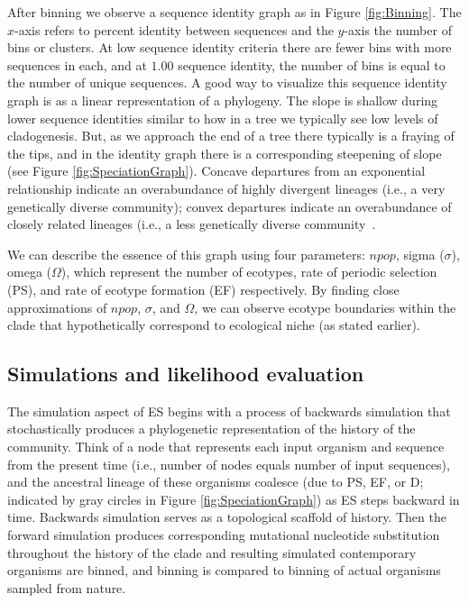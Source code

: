 After binning we observe a sequence identity graph as in Figure \ref{fig:Binning}.
The $x$-axis refers to percent identity between sequences and the $y$-axis the number of bins or clusters.
At low sequence identity criteria there are fewer bins with more sequences in each, and at $1.00$ sequence identity, the number of bins is equal to the number of unique sequences.
A good way to visualize this sequence identity graph is as a linear representation of a phylogeny.
The slope is shallow during lower sequence identities similar to how in a tree we typically see low levels of cladogenesis.
But, as we approach the end of a tree there typically is a fraying of the tips, and in the identity graph there is a corresponding steepening of slope (see Figure \ref{fig:SpeciationGraph}).
Concave departures from an exponential relationship indicate an overabundance of highly divergent lineages (i.e., a very genetically diverse community); convex departures indicate an overabundance of closely related lineages (i.e., a less genetically diverse community~\cite{bohannan2003new}.

We can describe the essence of this graph using four parameters: $npop$, sigma ($\sigma$), omega ($\Omega$), which represent the number of ecotypes, rate of periodic selection (PS), and rate of ecotype formation (EF) respectively.
By finding close approximations of $npop$, $\sigma$, and $\Omega$, we can observe ecotype boundaries within the clade that hypothetically correspond to ecological niche (as stated earlier).

\subsection*{Simulations and likelihood evaluation}
The simulation aspect of ES begins with a process of backwards simulation that stochastically produces a phylogenetic representation of the history of the community.
Think of a node that represents each input organism and sequence from the present time (i.e., number of nodes equals number of input sequences), and the ancestral lineage of these organisms coalesce (due to PS, EF, or D; indicated by gray circles in Figure \ref{fig:SpeciationGraph}) as ES steps backward in time.
Backwards simulation serves as a topological scaffold of history.
Then the forward simulation produces corresponding mutational nucleotide substitution throughout the history of the clade and resulting simulated contemporary organisms are binned, and binning is compared to binning of actual organisms sampled from nature.

